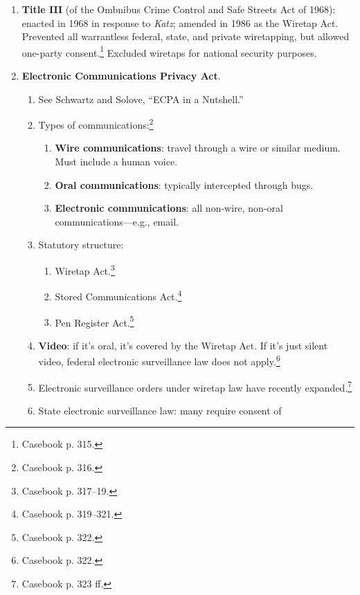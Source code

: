 \begin{enumerate}
\begin{enumerate}
        communications.\footnote{Casebook p. 313.} Did not apply to state 
        prosecutions or bugging (i.e., non-wire communications).
        \item \textbf{Title III} (of the Ombnibus Crime Control and Safe 
        Streets Act of 1968): enacted in 1968 in response to \emph{Katz}; 
        amended in 1986 as the Wiretap Act. Prevented all warrantless federal, 
        state, and private wiretapping, but allowed one-party 
        consent.\footnote{Casebook p. 315.} Excluded wiretaps for national 
        security purposes.
        \item \textbf{Electronic Communications Privacy Act}.
        \begin{enumerate}
            \item See Schwartz and Solove, ``ECPA in a Nutshell.''
            \item Types of communications:\footnote{Casebook p. 316.}
            \begin{enumerate}
                \item \textbf{Wire communications}: travel through a wire or 
                similar medium. Must include a human voice.
                \item \textbf{Oral communications}: typically intercepted 
                through bugs.
                \item \textbf{Electronic communications}: all non-wire, 
                non-oral communications---e.g., email.  \end{enumerate}
            \item Statutory structure:
            \begin{enumerate}
                \item Wiretap Act.\footnote{Casebook p. 317--19.}
                \item Stored Communications Act.\footnote{Casebook p. 
                319--321.}
                \item Pen Register Act.\footnote{Casebook p. 322.}
            \end{enumerate}
            \item \textbf{Video}: if it's oral, it's covered by the Wiretap 
            Act. If it's just silent video, federal electronic surveillance 
            law does not apply.\footnote{Casebook p. 322.}
            \item Electronic surveillance orders under wiretap law have 
            recently expanded.\footnote{Casebook p. 323 ff.}
            \item State electronic surveillance law: many require consent of 

\end{enumerate}
\end{enumerate}
\end{enumerate}
